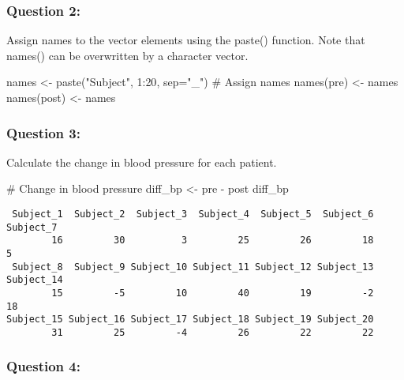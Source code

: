 \documentclass[
  letterpaper,
  DIV=11,
  numbers=noendperiod]{scrartcl}
\newenvironment{Shaded}{\begin{snugshade}}{\end{snugshade}}
\newcommand{\AttributeTok}[1]{\textcolor[rgb]{0.40,0.45,0.13}{#1}}
\newcommand{\CommentTok}[1]{\textcolor[rgb]{0.37,0.37,0.37}{#1}}
\newcommand{\DecValTok}[1]{\textcolor[rgb]{0.68,0.00,0.00}{#1}}
\newcommand{\FunctionTok}[1]{\textcolor[rgb]{0.28,0.35,0.67}{#1}}
\newcommand{\NormalTok}[1]{\textcolor[rgb]{0.00,0.23,0.31}{#1}}
\newcommand{\OtherTok}[1]{\textcolor[rgb]{0.00,0.23,0.31}{#1}}
\newcommand{\SpecialCharTok}[1]{\textcolor[rgb]{0.37,0.37,0.37}{#1}}
\newcommand{\StringTok}[1]{\textcolor[rgb]{0.13,0.47,0.30}{#1}}
\begin{document}
\subsubsection{Question 2:}\label{question-2}

Assign names to the vector elements using the paste() function. Note
that names() can be overwritten by a character vector.

\begin{Shaded}
\begin{Highlighting}[]
\NormalTok{names }\OtherTok{\textless{}{-}} \FunctionTok{paste}\NormalTok{(}\StringTok{"Subject"}\NormalTok{, }\DecValTok{1}\SpecialCharTok{:}\DecValTok{20}\NormalTok{, }\AttributeTok{sep=}\StringTok{"\_"}\NormalTok{)}
\CommentTok{\# Assign names}
\FunctionTok{names}\NormalTok{(pre) }\OtherTok{\textless{}{-}}\NormalTok{ names}
\FunctionTok{names}\NormalTok{(post) }\OtherTok{\textless{}{-}}\NormalTok{ names}
\end{Highlighting}
\end{Shaded}

\subsubsection{Question 3:}\label{question-3}

Calculate the change in blood pressure for each patient.

\begin{Shaded}
\begin{Highlighting}[]
\CommentTok{\# Change in blood pressure}
\NormalTok{diff\_bp }\OtherTok{\textless{}{-}}\NormalTok{ pre }\SpecialCharTok{{-}}\NormalTok{ post}
\NormalTok{diff\_bp}
\end{Highlighting}
\end{Shaded}

\begin{verbatim}
 Subject_1  Subject_2  Subject_3  Subject_4  Subject_5  Subject_6  Subject_7 
        16         30          3         25         26         18          5 
 Subject_8  Subject_9 Subject_10 Subject_11 Subject_12 Subject_13 Subject_14 
        15         -5         10         40         19         -2         18 
Subject_15 Subject_16 Subject_17 Subject_18 Subject_19 Subject_20 
        31         25         -4         26         22         22 
\end{verbatim}

\subsubsection{Question 4:}\label{question-4}
\end{document}
